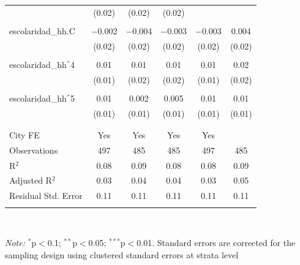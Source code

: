 \begin{table}[H]
\begin{tabularx}{0.9\textwidth}{@{\extracolsep{-7pt}}lccccc}
& (0.02) & (0.02) & (0.02) \\    & & & & & \\   escolaridad\_hh.C & $-$0.002 & $-$0.004 & $-$0.003 & $-$0.003 & 0.004 \\    & (0.02) & (0.02) & (0.02) & (0.02) & (0.02) \\    & & & & & \\   escolaridad\_hh$\hat{\mkern6mu}$4 & 0.01 & 0.01 & 0.01 & 0.01 & 0.02 \\    & (0.01) & (0.02) & (0.02) & (0.01) & (0.02) \\    & & & & & \\   escolaridad\_hh$\hat{\mkern6mu}$5 & 0.01 & 0.002 & 0.005 & 0.01 & 0.01 \\    & (0.01) & (0.01) & (0.01) & (0.01) & (0.01) \\    & & & & & \\  \hline \\[-1.8ex]  City FE & Yes & Yes & Yes & Yes &  \\  Observations & 497 & 485 & 485 & 497 & 485 \\  R$^{2}$ & 0.08 & 0.09 & 0.08 & 0.08 & 0.09 \\  Adjusted R$^{2}$ & 0.03 & 0.04 & 0.04 & 0.03 & 0.05 \\  Residual Std. Error & 0.11 & 0.11 & 0.11 & 0.11 & 0.11 \\  \hline  \hline \\[-1.8ex]  \end{tabularx} \\ \parbox[]{\textwidth}{\textit{Note:} $^{*}$p$<$0.1; $^{**}$p$<$0.05; $^{***}$p$<$0.01. Standard errors are corrected for the sampling design using clustered standard errors at strata level }  \end{table} 